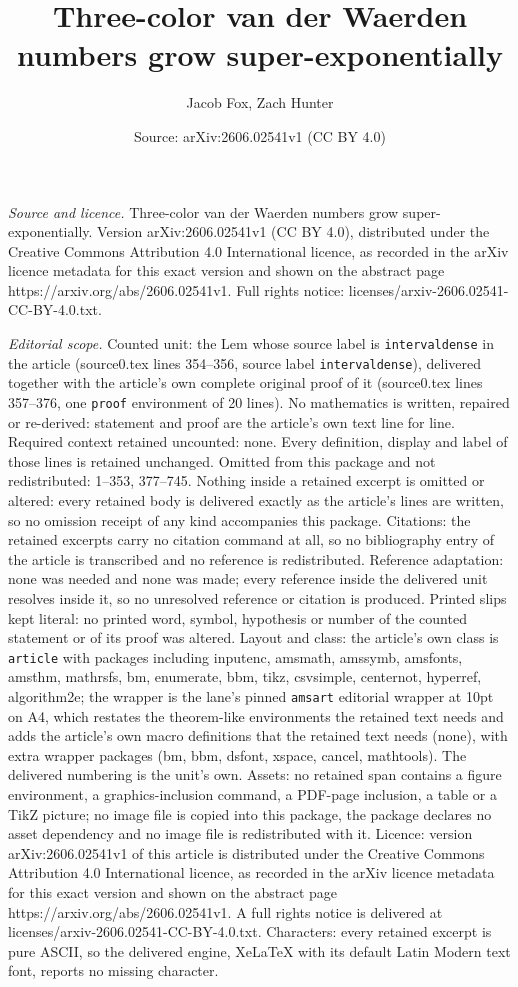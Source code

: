 \documentclass[10pt,a4paper]{amsart}
\title[Three-color van der Waerden numbers grow super-exponentially]{Three-color van der Waerden numbers grow super-exponentially}
\author{Jacob Fox, Zach Hunter}
\date{Source: arXiv:2606.02541v1 (CC BY 4.0)}
\begin{document}
\maketitle

\noindent\emph{Source and licence.} Three-color van der Waerden numbers grow super-exponentially. Version arXiv:2606.02541v1 (CC BY 4.0), distributed under the Creative Commons Attribution 4.0 International licence, as recorded in the arXiv licence metadata for this exact version and shown on the abstract page https://arxiv.org/abs/2606.02541v1. Full rights notice: licenses/arxiv-2606.02541-CC-BY-4.0.txt.\par\smallskip

\noindent\textit{Editorial scope.} Counted unit: the Lem whose source label is \texttt{intervaldense} in the article (source0.tex lines 354--356, source label \texttt{intervaldense}), delivered together with the article's own complete original proof of it (source0.tex lines 357--376, one \texttt{proof} environment of 20 lines). No mathematics is written, repaired or re-derived: statement and proof are the article's own text line for line. Required context retained uncounted: none. Every definition, display and label of those lines is retained unchanged. Omitted from this package and not redistributed: 1--353, 377--745. Nothing inside a retained excerpt is omitted or altered: every retained body is delivered exactly as the article's lines are written, so no omission receipt of any kind accompanies this package. Citations: the retained excerpts carry no citation command at all, so no bibliography entry of the article is transcribed and no reference is redistributed. Reference adaptation: none was needed and none was made; every reference inside the delivered unit resolves inside it, so no unresolved reference or citation is produced. Printed slips kept literal: no printed word, symbol, hypothesis or number of the counted statement or of its proof was altered. Layout and class: the article's own class is \texttt{article} with packages including inputenc, amsmath, amssymb, amsfonts, amsthm, mathrsfs, bm, enumerate, bbm, tikz, csvsimple, centernot, hyperref, algorithm2e; the wrapper is the lane's pinned \texttt{amsart} editorial wrapper at 10pt on A4, which restates the theorem-like environments the retained text needs and adds the article's own macro definitions that the retained text needs (none), with extra wrapper packages (bm, bbm, dsfont, xspace, cancel, mathtools). The delivered numbering is the unit's own. Assets: no retained span contains a figure environment, a graphics-inclusion command, a PDF-page inclusion, a table or a TikZ picture; no image file is copied into this package, the package declares no asset dependency and no image file is redistributed with it. Licence: version arXiv:2606.02541v1 of this article is distributed under the Creative Commons Attribution 4.0 International licence, as recorded in the arXiv licence metadata for this exact version and shown on the abstract page https://arxiv.org/abs/2606.02541v1. A full rights notice is delivered at licenses/arxiv-2606.02541-CC-BY-4.0.txt. Characters: every retained excerpt is pure ASCII, so the delivered engine, XeLaTeX with its default Latin Modern text font, reports no missing character.
\end{document}
